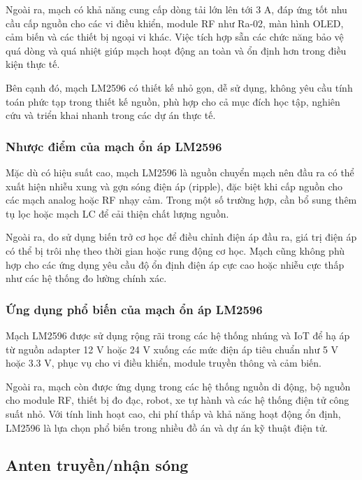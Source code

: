 \documentclass{article}
\begin{document}
	Ngoài ra, mạch có khả năng cung cấp dòng tải lớn lên tới 3 A, đáp ứng tốt nhu cầu cấp nguồn cho các vi điều khiển, module RF như Ra-02, màn hình OLED, cảm biến và các thiết bị ngoại vi khác. Việc tích hợp sẵn các chức năng bảo vệ quá dòng và quá nhiệt giúp mạch hoạt động an toàn và ổn định hơn trong điều kiện thực tế.
	
	Bên cạnh đó, mạch LM2596 có thiết kế nhỏ gọn, dễ sử dụng, không yêu cầu tính toán phức tạp trong thiết kế nguồn, phù hợp cho cả mục đích học tập, nghiên cứu và triển khai nhanh trong các dự án thực tế.
	
	\subsubsection{Nhược điểm của mạch ổn áp LM2596}
	
	Mặc dù có hiệu suất cao, mạch LM2596 là nguồn chuyển mạch nên đầu ra có thể xuất hiện nhiễu xung và gợn sóng điện áp (ripple), đặc biệt khi cấp nguồn cho các mạch analog hoặc RF nhạy cảm. Trong một số trường hợp, cần bổ sung thêm tụ lọc hoặc mạch LC để cải thiện chất lượng nguồn.
	
	Ngoài ra, do sử dụng biến trở cơ học để điều chỉnh điện áp đầu ra, giá trị điện áp có thể bị trôi nhẹ theo thời gian hoặc rung động cơ học. Mạch cũng không phù hợp cho các ứng dụng yêu cầu độ ổn định điện áp cực cao hoặc nhiễu cực thấp như các hệ thống đo lường chính xác.
	
	\subsubsection{Ứng dụng phổ biến của mạch ổn áp LM2596}
	
	Mạch LM2596 được sử dụng rộng rãi trong các hệ thống nhúng và IoT để hạ áp từ nguồn adapter 12 V hoặc 24 V xuống các mức điện áp tiêu chuẩn như 5 V hoặc 3.3 V, phục vụ cho vi điều khiển, module truyền thông và cảm biến.
	
	Ngoài ra, mạch còn được ứng dụng trong các hệ thống nguồn di động, bộ nguồn cho module RF, thiết bị đo đạc, robot, xe tự hành và các hệ thống điện tử công suất nhỏ. Với tính linh hoạt cao, chi phí thấp và khả năng hoạt động ổn định, LM2596 là lựa chọn phổ biến trong nhiều đồ án và dự án kỹ thuật điện tử.
	
	\subsection{Anten truyền/nhận sóng}
	
\end{document}
